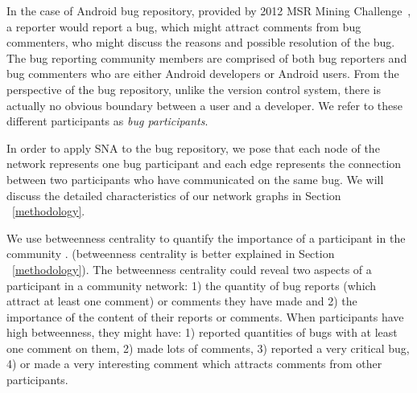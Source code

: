 \documentclass[10pt, conference, compsocconf]{IEEEtran}
\begin{document}

In the case of Android bug repository, provided by 2012 MSR
Mining Challenge~\cite{DATA:msr}, a reporter would report a bug, which
might attract comments from bug commenters, who might discuss the
reasons and possible resolution of the bug.
The bug reporting community members are comprised of both bug
reporters and bug commenters who are either Android developers or
Android users.
From the perspective of the bug repository, unlike the version control
system, there is actually no
obvious boundary between a user and a developer.
We refer to these different participants as \emph{bug participants}.

In order to apply SNA to the bug repository, we pose that each node of the network represents
one bug participant and each edge represents the connection between
two participants who have communicated on the same bug. 
We will discuss the detailed characteristics of our network graphs in
Section ~\ref{methodology}.

We use betweenness centrality to quantify the importance of a
participant in the community \cite{ICSEsocio:la}. 
(betweenness centrality is better explained in 
 Section ~\ref{methodology}).
The betweenness centrality could reveal two aspects of a participant
in a community network: 1) the quantity of bug reports (which attract
at least one comment) or comments they have made and 2) the importance
of the content of their reports or comments. 
When participants have high betweenness, they might have: 1) reported
quantities of bugs with at least one comment on them, 2) made lots of
comments, 3) reported a very critical bug, 4) or made a very
interesting comment which attracts comments from other participants.


\end{document}

